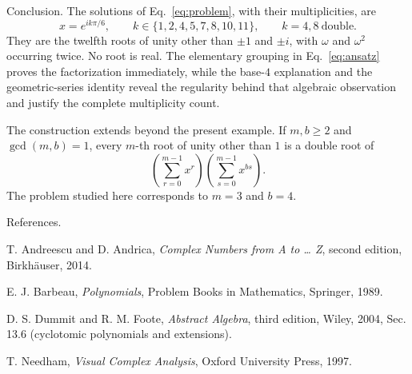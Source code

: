 \documentclass[11pt,aspectratio=169]{beamer}
\newcommand{\slidebody}{%
  \fontsize{10.6}{12.8}\selectfont\justifying%
  \setlength{\parskip}{4.2pt}%
  \setlength{\abovedisplayskip}{4pt}%
  \setlength{\belowdisplayskip}{4pt}%
  \setlength{\abovedisplayshortskip}{2pt}%
  \setlength{\belowdisplayshortskip}{2.5pt}%
}
\newcommand{\tightbody}{\slidebody\fontsize{10.2}{12.3}\selectfont\setlength{\parskip}{3pt}}
\begin{document}
\begin{frame}[t]{Conclusion.}
\tightbody
The solutions of Eq.~\eqref{eq:problem}, with their multiplicities, are
\begin{equation}\label{eq:final-roots}
 x=e^{ik\pi/6},\qquad
 k\in\{1,2,4,5,7,8,10,11\},
 \qquad k=4,8\ \text{double}.
\end{equation}
They are the twelfth roots of unity other than $\pm1$ and $\pm i$, with $\omega$ and $\omega^2$ occurring twice. No root is real. The elementary grouping in Eq.~\eqref{eq:ansatz} proves the factorization immediately, while the base-$4$ explanation and the geometric-series identity reveal the regularity behind that algebraic observation and justify the complete multiplicity count.

The construction extends beyond the present example. If $m,b\ge 2$ and $\gcd(m,b)=1$, every $m$-th root of unity other than $1$ is a double root of
\begin{equation}\label{eq:generalization}
 \left(\sum_{r=0}^{m-1}x^r\right)
 \left(\sum_{s=0}^{m-1}x^{bs}\right).
\end{equation}
The problem studied here corresponds to $m=3$ and $b=4$.
\end{frame}

\begin{frame}[t]{References.}
\slidebody
\begingroup
\fontsize{10.45}{14.0}\selectfont
\begin{list}{\textbullet}{%
\setlength{\leftmargin}{5.5mm}%
\setlength{\labelwidth}{2.5mm}%
\setlength{\labelsep}{2.1mm}%
\setlength{\itemindent}{0pt}%
\setlength{\itemsep}{3.8mm}%
\setlength{\parsep}{0pt}%
}
\item \justifying T. Andreescu and D. Andrica, \textit{Complex Numbers from A to \ldots{} Z}, second edition, Birkhäuser, 2014.
\item \justifying E. J. Barbeau, \textit{Polynomials}, Problem Books in Mathematics, Springer, 1989.
\item \justifying D. S. Dummit and R. M. Foote, \textit{Abstract Algebra}, third edition, Wiley, 2004, Sec. 13.6 (cyclotomic polynomials and extensions).
\item \justifying T. Needham, \textit{Visual Complex Analysis}, Oxford University Press, 1997.
\end{list}
\endgroup
\end{frame}
\end{document}

